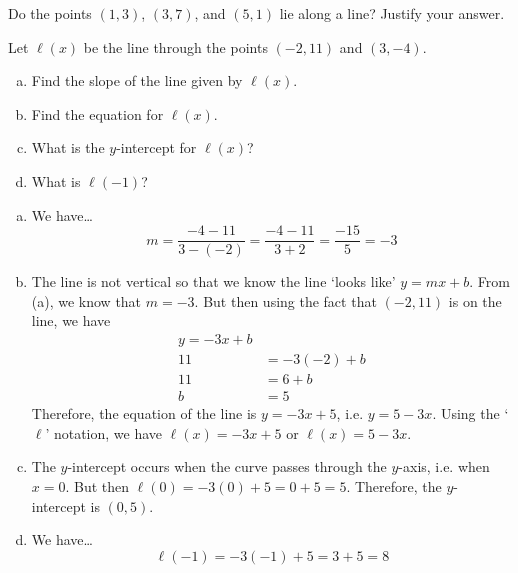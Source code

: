 \documentclass[11pt,letterpaper]{article}
\begin{document}
\newpage





 Do the points $(1, 3)$, $(3, 7)$, and $(5,1)$ lie along a line? Justify your answer. \pvspace{1.1cm}






\newpage





 Let $\ell(x)$ be the line through the points $(-2, 11)$ and $(3, -4)$.
	\begin{enumerate}[(a)]
	\item Find the slope of the line given by $\ell(x)$.
	\item Find the equation for $\ell(x)$.
	\item What is the $y$-intercept for $\ell(x)$?
	\item What is $\ell(-1)$?
	\end{enumerate} \pspace

\sol
{\itshape
\begin{enumerate}[(a)]
\item We have\dots
	\[
	m= \dfrac{-4 - 11}{3 - (-2)}= \dfrac{-4 - 11}{3 + 2}= \dfrac{-15}{5}= -3
	\] \pspace


\item The line is not vertical so that we know the line `looks like' $y= mx + b$. From (a), we know that $m= -3$. But then using the fact that $(-2, 11)$ is on the line, we have
	\[
	\begin{aligned}
	y= -3x + b \\
	11&= -3(-2) + b \\
	11&= 6 + b \\
	b&= 5
	\end{aligned}
	\]
Therefore, the equation of the line is $y= -3x + 5$, i.e. $y= 5 - 3x$. Using the `$\ell$' notation, we have $\ell(x)= -3x + 5$ or $\ell(x)= 5 - 3x$. \pspace


\item The $y$-intercept occurs when the curve passes through the $y$-axis, i.e. when $x= 0$. But then $\ell(0)= -3(0) + 5= 0 + 5= 5$. Therefore, the $y$-intercept is $(0, 5)$. \pspace

\item We have\dots
	\[
	\ell(-1)= -3(-1) + 5= 3 + 5= 8 
	\]
\end{enumerate}
}
\end{document}
